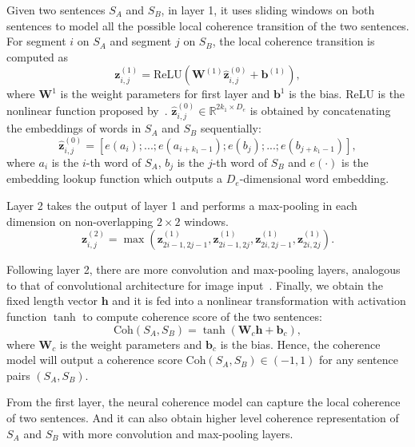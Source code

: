 \documentclass[letterpaper]{article} \usepackage{aaai18}  \usepackage{times}  \usepackage{helvet}  \usepackage{courier}  \usepackage{url}  \usepackage{graphicx}  \usepackage{amssymb}
\begin{document}
	Given two sentences $S_A$ and $S_B$, in layer 1, it uses sliding windows on both sentences to model all the possible local coherence transition of the two sentences. For segment $i$ on $S_A$ and segment $j$ on $S_B$, the local coherence transition is computed as
	\begin{equation*}
	\mathbf{z}^{(1)}_{i,j}  = \text{ReLU}(\mathbf{W}^{(1)} \hat{\mathbf{z}}^{(0)}_{i,j} + \mathbf{b}^{(1)}),
	\end{equation*}
	where $\mathbf{W}^1$ is the weight parameters for first layer and $\mathbf{b}^1$ is the bias. ReLU is the nonlinear function proposed by~\cite{relu}. $\hat{\mathbf{z}}^{(0)}_{i,j} \in \mathbb{R}^{2k_1 \times D_{e}}$ is obtained by concatenating the embeddings of words in $S_A$ and $S_B$ sequentially:
	\begin{equation*}
	\hat{\mathbf{z}}^{(0)}_{i,j} =  [e(a_i); ... ; e(a_{i+k_1-1}); e(b_j);...; e(b_{j+k_1-1})],
	\end{equation*}
	where $a_i$ is the $i$-th word of $S_A$, $b_j$ is the $j$-th word of $S_B$ and $e(\cdot)$ is the embedding lookup function which outputs a $D_e$-dimensional word embedding.
	
	Layer 2 takes the output of layer 1 and performs a max-pooling in each dimension on non-overlapping $2\times2$ windows.
	\begin{equation*}
	\mathbf{z}_{i,j}^{(2)} = \max(\mathbf{z}_{2i-1,2j-1}^{(1)}, \mathbf{z}_{2i-1,2j}^{(1)},\mathbf{z}_{2i,2j-1}^{(1)},\mathbf{z}_{2i,2j}^{(1)}). 
\end{equation*}
	
	Following layer 2, there are more convolution and  max-pooling layers, analogous to that of convolutional architecture for image input~\cite{cnn}. Finally, we obtain the fixed length vector $\mathbf{h}$ and it is fed into a nonlinear transformation with activation function $\tanh$ to compute coherence score of the two sentences:
	\begin{equation}\label{eq:coh}
	\text{Coh}(S_A,S_B) = \tanh(\mathbf{W}_c  \mathbf{h}+ \mathbf{b}_c), 
	\end{equation}
	where $\mathbf{W}_c$ is the weight parameters and $\mathbf{b}_c$ is the bias. Hence, the coherence model will output a coherence score  $\text{Coh}(S_A, S_B) \in (-1,1)$ for any sentence pairs $(S_A, S_B)$.
	
	From the first layer, the neural coherence model can capture the local coherence of two sentences.  And it can also obtain higher level coherence representation of $S_A$ and $S_B$ with more convolution and max-pooling layers.
	
\end{document}
